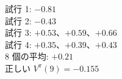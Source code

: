 \textcolor{bookblue}{試行 1}: $-0.81$\\
\textcolor{bookorange}{試行 2}: $-0.43$\\
\textcolor{bookgreen}{試行 3}: $+0.53$、$+0.59$、$+0.66$\\
\textcolor{bookpurple}{試行 4}: $+0.35$、$+0.39$、$+0.43$\\
8 個の平均: $+0.21$\\
正しい $V^\pi(9)=-0.155$
